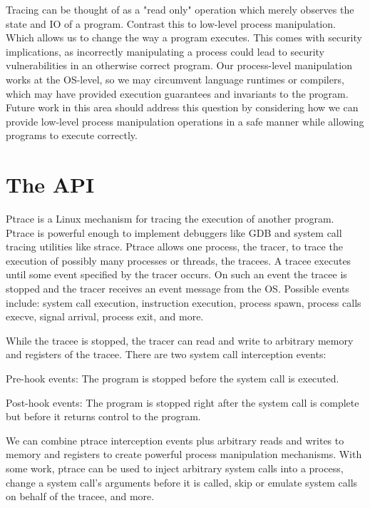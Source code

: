 Tracing can be thought of as a "read only" operation which merely observes the state and IO of a program. Contrast this to low-level process manipulation. Which allows us to change the way a program executes. This comes with security implications, as incorrectly manipulating a process could lead to security vulnerabilities in an otherwise correct program. Our process-level manipulation works at the OS-level, so we may circumvent language runtimes or compilers, which may have provided execution guarantees and invariants to the program. Future work in this area should address this question by considering how we can provide low-level process manipulation operations in a safe manner while allowing programs to execute correctly.


\section{The  API} \label{sec:ptrace-summary}

Ptrace is a Linux mechanism for tracing the execution of another program. Ptrace is powerful enough to implement debuggers like GDB and system call tracing utilities like strace. Ptrace allows one process, the tracer, to trace the execution of possibly many processes or threads, the tracees. A tracee executes until some event specified by the tracer occurs. On such an event the tracee is stopped and the tracer receives an event message from the OS. Possible events include: system call execution, instruction execution, process spawn, process calls execve, signal arrival, process exit, and more.

While the tracee is stopped, the tracer can read and write to arbitrary memory and registers of the tracee. There are two system call interception events:
\begin{compactitem}
     \item Pre-hook events: The program is stopped before the system call is executed.
     \item Post-hook events: The program is stopped right after the system call is complete but before it returns control to the program.
\end{compactitem}
     We can combine ptrace interception events plus arbitrary reads and writes to memory and registers to create powerful process manipulation mechanisms. With some work, ptrace can be used to inject arbitrary system calls into a process, change a system call's arguments before it is called, skip or emulate system calls on behalf of the tracee, and more.
     

